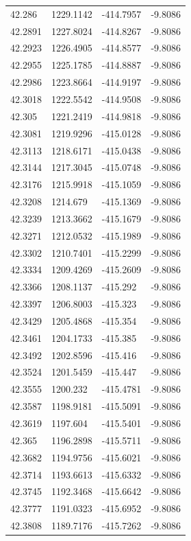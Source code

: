 \begin{table}[H]
\begin{tabular}{llll}
42.286 & 1229.1142 & -414.7957 & -9.8086 \\
42.2891 & 1227.8024 & -414.8267 & -9.8086 \\
42.2923 & 1226.4905 & -414.8577 & -9.8086 \\
42.2955 & 1225.1785 & -414.8887 & -9.8086 \\
42.2986 & 1223.8664 & -414.9197 & -9.8086 \\
42.3018 & 1222.5542 & -414.9508 & -9.8086 \\
42.305 & 1221.2419 & -414.9818 & -9.8086 \\
42.3081 & 1219.9296 & -415.0128 & -9.8086 \\
42.3113 & 1218.6171 & -415.0438 & -9.8086 \\
42.3144 & 1217.3045 & -415.0748 & -9.8086 \\
42.3176 & 1215.9918 & -415.1059 & -9.8086 \\
42.3208 & 1214.679 & -415.1369 & -9.8086 \\
42.3239 & 1213.3662 & -415.1679 & -9.8086 \\
42.3271 & 1212.0532 & -415.1989 & -9.8086 \\
42.3302 & 1210.7401 & -415.2299 & -9.8086 \\
42.3334 & 1209.4269 & -415.2609 & -9.8086 \\
42.3366 & 1208.1137 & -415.292 & -9.8086 \\
42.3397 & 1206.8003 & -415.323 & -9.8086 \\
42.3429 & 1205.4868 & -415.354 & -9.8086 \\
42.3461 & 1204.1733 & -415.385 & -9.8086 \\
42.3492 & 1202.8596 & -415.416 & -9.8086 \\
42.3524 & 1201.5459 & -415.447 & -9.8086 \\
42.3555 & 1200.232 & -415.4781 & -9.8086 \\
42.3587 & 1198.9181 & -415.5091 & -9.8086 \\
42.3619 & 1197.604 & -415.5401 & -9.8086 \\
42.365 & 1196.2898 & -415.5711 & -9.8086 \\
42.3682 & 1194.9756 & -415.6021 & -9.8086 \\
42.3714 & 1193.6613 & -415.6332 & -9.8086 \\
42.3745 & 1192.3468 & -415.6642 & -9.8086 \\
42.3777 & 1191.0323 & -415.6952 & -9.8086 \\
42.3808 & 1189.7176 & -415.7262 & -9.8086 \\

\end{tabular}
\end{table}
